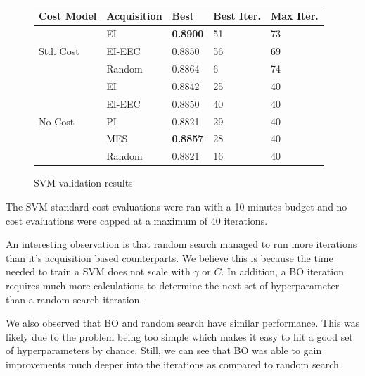 \documentclass[letterpaper]{article}
\begin{document}
\begin{figure}[h]
\begin{center}
	\begin{tabular}{lllll}
		\hline
		Cost Model & Acquisition & Best & Best Iter. & Max Iter.\\
		\hline
		\multirow{3}{*}{Std. Cost} & EI &  \textbf{0.8900} & 51 & 73\\
		& EI-EEC & 0.8850 & 56 & 69\\
		& Random & 0.8864 & 6 & 74\\
		\hline
		\multirow{5}{*}{No Cost} & EI & 0.8842 & 25 & 40\\
		& EI-EEC & 0.8850 & 40 & 40\\
		& PI & 0.8821 & 29 & 40\\
		& MES & \textbf{0.8857} & 28 & 40\\
		& Random & 0.8821 & 16 & 40\\
		\hline
	\end{tabular}
\end{center}
	\caption{SVM validation results}
\end{figure}
The SVM standard cost evaluations were ran with a 10 minutes budget and no cost evaluations were capped at a maximum of 40 iterations.

An interesting observation is that random search managed to run more iterations than it's acquisition based counterparts.
We believe this is because the time needed to train a SVM does not scale with $\gamma$ or $\textit{C}$.
In addition, a BO iteration requires much more calculations to determine the next set of hyperparameter than a random search iteration.

We also observed that BO and random search have similar performance.
This was likely due to the problem being too simple which makes it easy to hit a good set of hyperparameters by chance.
Still, we can see that BO was able to gain improvements much deeper into the iterations as compared to random search.
\end{document}
